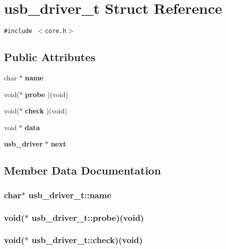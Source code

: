 \section{usb\_\-driver\_\-t Struct Reference}
\label{structusb__driver__t}
{\tt \#include $<$core.h$>$}

\subsection*{Public Attributes}
\begin{CompactItemize}
\item 
char $\ast$ {\bf name}
\item 
void($\ast$ {\bf probe} )(void)
\item 
void($\ast$ {\bf check} )(void)
\item 
void $\ast$ {\bf data}
\item 
{\bf usb\_\-driver} $\ast$ {\bf next}
\end{CompactItemize}


\subsection{Member Data Documentation}
\subsubsection{\setlength{\rightskip}{0pt plus 5cm}char$\ast$ {\bf usb\_\-driver\_\-t::name}}\label{structusb__driver__t_65fe707a6163e32e09cbadc09e4947e6}


\subsubsection{\setlength{\rightskip}{0pt plus 5cm}void($\ast$ {\bf usb\_\-driver\_\-t::probe})(void)}\label{structusb__driver__t_bfb489350640e1705ebb5d0655955a2b}


\subsubsection{\setlength{\rightskip}{0pt plus 5cm}void($\ast$ {\bf usb\_\-driver\_\-t::check})(void)}\label{structusb__driver__t_9b9ec145a03f3baa18a73d8aaf0f0b7f}


